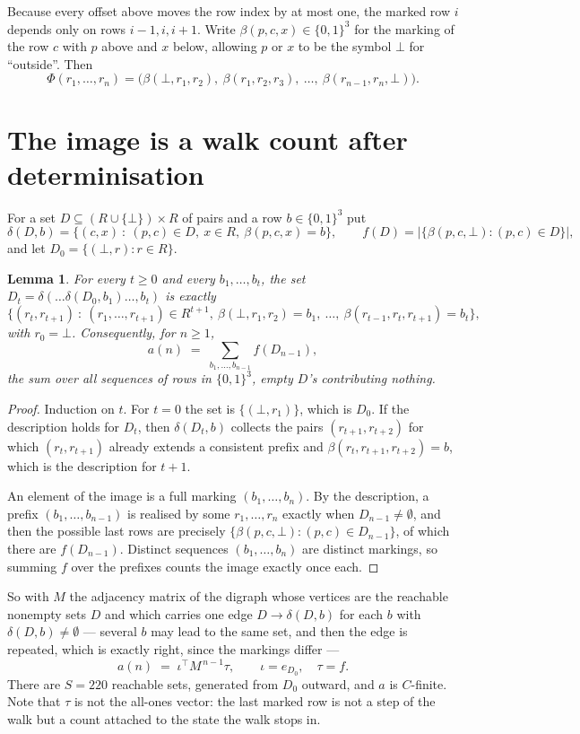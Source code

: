 \documentclass[11pt,a4paper]{article}
\theoremstyle{plain}
\newtheorem{lemma}[theorem]{Lemma}
\theoremstyle{definition}
\begin{document}
Because every offset above moves the row index by at most one, the marked row $i$ depends only
on rows $i-1,i,i+1$. Write $\beta(p,c,x)\in\{0,1\}^{3}$ for the marking of the row $c$
with $p$ above and $x$ below, allowing $p$ or $x$ to be the symbol $\bot$ for ``outside''.
Then
\[
\Phi(r_1,\dots,r_n)=\bigl(\beta(\bot,r_1,r_2),\ \beta(r_1,r_2,r_3),\ \dots,\
\beta(r_{n-1},r_n,\bot)\bigr).
\]

\section{The image is a walk count after determinisation}

For a set $D\subseteq(R\cup\{\bot\})\times R$ of pairs and a row $b\in\{0,1\}^{3}$ put
\[
\delta(D,b)=\{(c,x)\ :\ (p,c)\in D,\ x\in R,\ \beta(p,c,x)=b\},\qquad
f(D)=\bigl|\{\beta(p,c,\bot):(p,c)\in D\}\bigr| ,
\]
and let $D_0=\{(\bot,r):r\in R\}$.

\begin{lemma}\label{lem:det}
For every $t\ge0$ and every $b_1,\dots,b_t$, the set
$D_t=\delta(\dots\delta(D_0,b_1)\dots,b_t)$ is exactly
\[
\{(r_t,r_{t+1})\ :\ (r_1,\dots,r_{t+1})\in R^{t+1},\ \beta(\bot,r_1,r_2)=b_1,\ \dots,\
\beta(r_{t-1},r_t,r_{t+1})=b_t\} ,
\]
with $r_0=\bot$. Consequently, for $n\ge1$,
\[
a(n)\;=\;\sum_{b_1,\dots,b_{n-1}}f(D_{n-1}),
\]
the sum over all sequences of rows in $\{0,1\}^{3}$, empty $D$'s contributing nothing.
\end{lemma}

\begin{proof}
Induction on $t$. For $t=0$ the set is $\{(\bot,r_1)\}$, which is $D_0$. If the description
holds for $D_t$, then $\delta(D_t,b)$ collects the pairs $(r_{t+1},r_{t+2})$ for which
$(r_t,r_{t+1})$ already extends a consistent prefix and
$\beta(r_t,r_{t+1},r_{t+2})=b$, which is the description for $t+1$.

An element of the image is a full marking $(b_1,\dots,b_n)$. By the description, a prefix
$(b_1,\dots,b_{n-1})$ is realised by some $r_1,\dots,r_n$ exactly when $D_{n-1}\neq
\emptyset$, and then the possible last rows are precisely
$\{\beta(p,c,\bot):(p,c)\in D_{n-1}\}$, of which there are $f(D_{n-1})$. Distinct
sequences $(b_1,\dots,b_n)$ are distinct markings, so summing $f$ over the prefixes counts the
image exactly once each.
\end{proof}

So with $M$ the adjacency matrix of the digraph whose vertices are the reachable nonempty sets
$D$ and which carries one edge $D\to\delta(D,b)$ for each $b$ with $\delta(D,b)\neq\emptyset$
--- several $b$ may lead to the same set, and then the edge is repeated, which is exactly
right, since the markings differ ---
\[
a(n)\;=\;\iota^{\!\top}M^{\,n-1}\tau,\qquad \iota=e_{D_0},\quad \tau=f .
\]
There are $S=220$ reachable sets, generated from $D_0$ outward, and $a$ is $C$-finite. Note
that $\tau$ is not the all-ones vector: the last marked row is not a step of the walk but a
count attached to the state the walk stops in.
\end{document}
